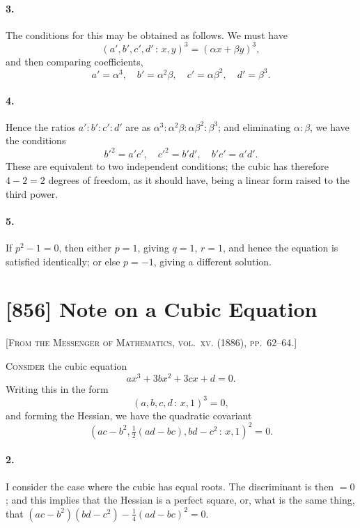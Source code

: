 \documentclass[11pt,a4paper]{book}
\begin{document}
\paragraph{3.} The conditions for this may be obtained as follows. We must have
\[
(a', b', c', d'\,\colon\,x, y)^{3} = (\alpha x + \beta y)^{3},
\]
and then comparing coefficients,
\[
a' = \alpha^{3}, \quad b' = \alpha^{2}\beta, \quad c' = \alpha\beta^{2}, \quad d' = \beta^{3}.
\]

\paragraph{4.} Hence the ratios $a' : b' : c' : d'$ are as $\alpha^{3} : \alpha^{2}\beta : \alpha\beta^{2} : \beta^{3}$; and eliminating $\alpha : \beta$, we have the conditions
\[
b'^{2} = a'c', \quad c'^{2} = b'd', \quad b'c' = a'd'.
\]
These are equivalent to two independent conditions; the cubic has therefore $4 - 2 = 2$ degrees of freedom, as it should have, being a linear form raised to the third power.

\paragraph{5.} If $p^{2} - 1 = 0$, then either $p = 1$, giving $q = 1$, $r = 1$, and hence the equation is satisfied identically; or else $p = -1$, giving a different solution.

\newpage
\section*{[856] Note on a Cubic Equation}

\noindent\textsc{[From the Messenger of Mathematics, vol.~xv. (1886), pp.~62--64.]}

\smallskip

\noindent\textsc{Consider} the cubic equation
\[
ax^{3} + 3bx^{2} + 3cx + d = 0.
\]
Writing this in the form
\[
(a, b, c, d\,\colon\,x, 1)^{3} = 0,
\]
and forming the Hessian, we have the quadratic covariant
\[
(ac - b^{2}, \tfrac{1}{2}(ad - bc), bd - c^{2}\,\colon\,x, 1)^{2} = 0.
\]

\paragraph{2.} I consider the case where the cubic has equal roots. The discriminant is then $= 0$; and this implies that the Hessian is a perfect square, or, what is the same thing, that $(ac - b^{2})(bd - c^{2}) - \frac{1}{4}(ad - bc)^{2} = 0$.
\end{document}
